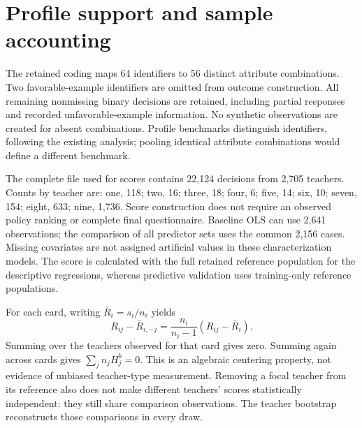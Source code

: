 \clearpage
\begingroup\color{revised}\endgroup
\clearpage\appendix
\section{Profile support and sample accounting}\label{app:support}
\begin{addition}
The retained coding maps 64 identifiers to 56 distinct attribute combinations. Two favorable-example identifiers are omitted from outcome construction. All remaining nonmissing binary decisions are retained, including partial responses and recorded unfavorable-example information. No synthetic observations are created for absent combinations. Profile benchmarks distinguish identifiers, following the existing analysis; pooling identical attribute combinations would define a different benchmark.

The complete file used for scores contains 22,124 decisions from 2,705 teachers. Counts by teacher are: one, 118; two, 16; three, 18; four, 6; five, 14; six, 10; seven, 154; eight, 633; nine, 1,736. Score construction does not require an observed policy ranking or complete final questionnaire. Baseline OLS can use 2,641 observations; the comparison of all predictor sets uses the common 2,156 cases. Missing covariates are not assigned artificial values in these characterization models. The score is calculated with the full retained reference population for the descriptive regressions, whereas predictive validation uses training-only reference populations.

For each card, writing $\bar R_i=s_i/n_i$ yields
\[
R_{ij}-\bar R_{i,-j}=\frac{n_i}{n_i-1}(R_{ij}-\bar R_i).
\]
Summing over the teachers observed for that card gives zero. Summing again across cards gives $\sum_j n_jH^b_j=0$. This is an algebraic centering property, not evidence of unbiased teacher-type measurement. Removing a focal teacher from its reference also does not make different teachers' scores statistically independent: they still share comparison observations. The teacher bootstrap reconstructs those comparisons in every draw.
\end{addition}

